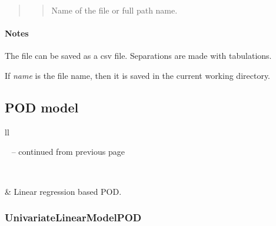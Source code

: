 \documentclass[letterpaper,10pt,english]{sphinxmanual}
\begin{document}
\begin{fulllineitems}
\begin{fulllineitems}
\begin{quote}
\begin{description}
\begin{quote}
Name of the file or full path name.
\end{quote}

\end{description}\end{quote}
\paragraph{Notes}

The file can be saved as a csv file. Separations are made with tabulations.

If \emph{name} is the file name, then it is saved in the current working
directory.

\end{fulllineitems}


\end{fulllineitems}



\subsection{POD model}
\label{user_manual:pod-model}
\begin{longtable}{ll}
\hline
\endfirsthead

%
{{\textsf{\tablename\ \thetable{} -- continued from previous page}}} \\
\hline
\endhead

\hline {} \\ \hline
\endfoot

\endlastfoot


{\hyperref[_generated/otpod.UnivariateLinearModelPOD:otpod.UnivariateLinearModelPOD]{\emph{}}}
 & 
Linear regression based POD.
\\
\hline\end{longtable}



\subsubsection{UnivariateLinearModelPOD}
\label{_generated/otpod.UnivariateLinearModelPOD:univariatelinearmodelpod}\label{_generated/otpod.UnivariateLinearModelPOD::doc}
\end{document}
